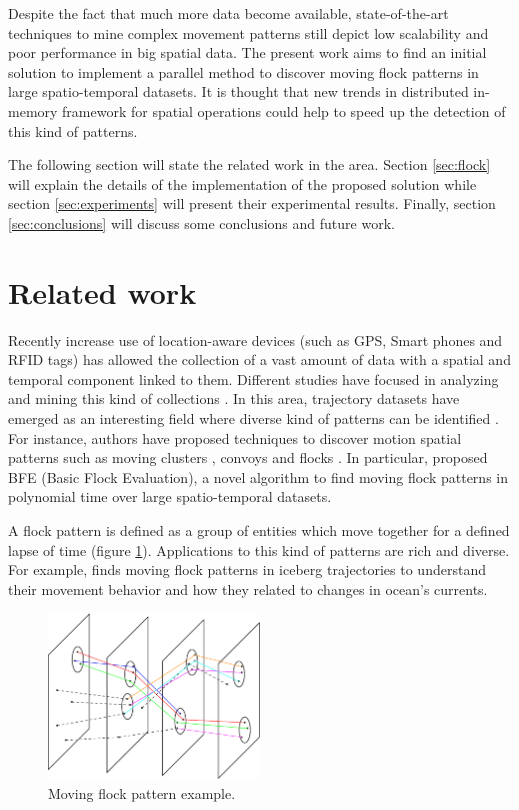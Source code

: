 \documentclass[12pt]{scrartcl}
\begin{document}
Despite the fact that much more data become available, state-of-the-art techniques to mine complex movement patterns still depict low scalability and poor performance in big spatial data.  The present work aims to find an initial solution to implement a parallel method to discover moving flock patterns in large spatio-temporal datasets.  It is thought that new trends in distributed in-memory framework for spatial operations could help to speed up the detection of this kind of patterns.

The following section will state the related work in the area.  Section \ref{sec:flock} will explain the details of the implementation of the proposed solution while section \ref{sec:experiments} will present their experimental results. Finally, section \ref{sec:conclusions} will discuss some conclusions and future work. 

\section{Related work}
Recently increase use of location-aware devices (such as GPS, Smart phones and RFID tags) has allowed the collection of a vast amount of data with a spatial and temporal component linked to them.  Different studies have focused in analyzing and mining this kind of collections \cite{leung_knowledge_2010, miller_geographic_2001}.  In this area, trajectory datasets have emerged as an interesting field where diverse kind of patterns can be identified \cite{zheng_computing_2011, vieira_spatio-temporal_2013}.  For instance, authors have proposed techniques to discover motion spatial patterns such as moving clusters \cite{kalnis_discovering_2005}, convoys \cite{jeung_discovery_2008} and flocks \cite{benkert_reporting_2008, gudmundsson_computing_2006}.  In particular, \cite{vieira_-line_2009} proposed BFE (Basic Flock Evaluation), a novel algorithm to find moving flock patterns in polynomial time over large spatio-temporal datasets.  
 
A flock pattern is defined as a group of entities which move together for a defined lapse of time \cite{benkert_reporting_2008} (figure \ref{fig:flock}).  Applications to this kind of patterns are rich and diverse.  For example, \cite{calderon_romero_mining_2011} finds moving flock patterns in iceberg trajectories to understand their movement behavior and how they related to changes in ocean's currents. 

\begin{figure}
 \centering
 \includegraphics[width=0.5\textwidth]{./figures/flock}
 \caption{Moving flock pattern example.}
 \label{fig:flock}
\end{figure}
 
\end{document}
